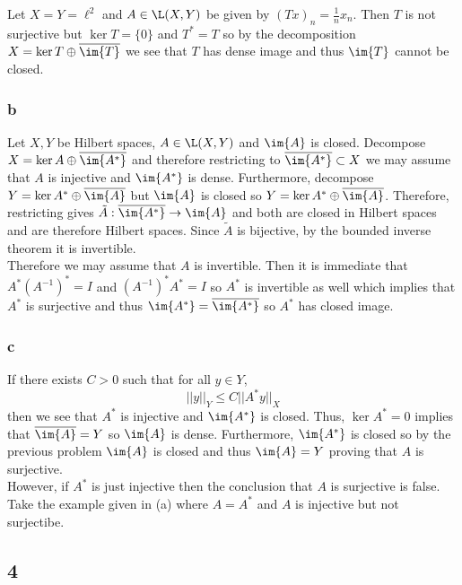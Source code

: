 \documentclass[12pt]{article}
\begin{document}
Let $X = Y = \ell^2$ and $A \in \L(X, Y)$ be given by $(T x)_n = \frac{1}{n} x_n$. Then $T$ is not surjective but $\ker{T} = \{ 0 \}$ and $T^* = T$ so by the decomposition $X = \ker{T} \oplus \overline{\im{T}}$ we see that $T$ has dense image and thus $\im{T}$ cannot be closed.

\subsubsection{b}

Let $X, Y$ be Hilbert spaces, $A \in \L(X, Y)$ and $\im{A}$ is closed. Decompose $X = \ker{A} \oplus \overline{\im{A^*}}$ and therefore restricting to $\overline{\im{A^*}} \subset X$ we may assume that $A$ is injective and $\im{A^*}$ is dense. Furthermore, decompose $Y = \ker{A^*} \oplus \overline{\im{A}}$ but $\im{A}$ is closed so $Y = \ker{A^*} \oplus \overline{\im{A}}$. Therefore, restricting gives $\tilde{A} : \overline{\im{A^*}} \to \im{A}$ and both are closed in Hilbert spaces and are therefore Hilbert spaces. Since $\tilde{A}$ is bijective, by the bounded inverse theorem it is invertible. 
\bigskip\\
Therefore we may assume that $A$ is invertible. Then it is immediate that $A^* (A^{-1})^* = I$ and $(A^{-1})^* A^* = I$ so $A^*$ is invertible as well which implies that $A^*$ is surjective and thus $\im{A^*} = \overline{\im{A^*}}$ so $A^*$ has closed image.


\subsubsection{c}

If there exists $C > 0$ such that for all $y \in Y$,
\[ || y ||_Y \le C || A^* y ||_X \]
then we see that $A^*$ is injective and $\im{A^*}$ is closed. Thus, $\ker{A^*} = 0$ implies that $\overline{\im{A}} = Y$ so $\im{A}$ is dense. Furthermore, $\im{A^*}$ is closed so by the previous problem $\im{A}$ is closed and thus $\im{A} = Y$ proving that $A$ is surjective.
\bigskip\\
However, if $A^*$ is just injective then the conclusion that $A$ is surjective is false. Take the example given in (a) where $A = A^*$ and $A$ is injective but not surjectibe.

\subsection{4}
\end{document}
